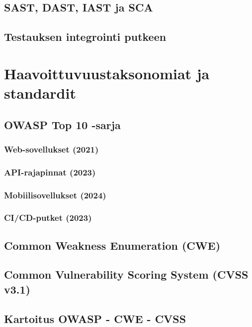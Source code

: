 \documentclass[bscthesis,finnish,oneside,biblatex]{uefcsthesis}
\begin{document}
  \subsection{SAST, DAST, IAST ja SCA}
  \subsection{Testauksen integrointi putkeen}

\section{Haavoittuvuustaksonomiat ja standardit}
\label{sec:taxonomies}

  \subsection{OWASP Top 10 -sarja}
    \subsubsection{Web-sovellukset (2021)}   %
    \subsubsection{API-rajapinnat (2023)}     %
    \subsubsection{Mobiilisovellukset (2024)} %
    \subsubsection{CI/CD-putket (2023)}       %

  \subsection{Common Weakness Enumeration (CWE)}
  \subsection{Common Vulnerability Scoring System (CVSS v3.1)}
  \subsection{Kartoitus OWASP - CWE - CVSS}
\end{document}
